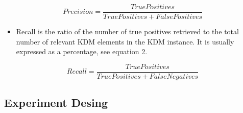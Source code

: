 



 


\begin{equation}
Precision=\frac{True Positives}{True Positives + False Positives}
\end{equation}

\begin{itemize}
\item Recall is the ratio of the number of true positives retrieved to the total number of relevant KDM elements in the KDM instance. It is usually expressed as a percentage, see equation 2.
\end{itemize}

\begin{equation}
Recall=\frac{True Positives}{True Positives + False Negatives}
\end{equation}

\subsection{Experiment Desing}

